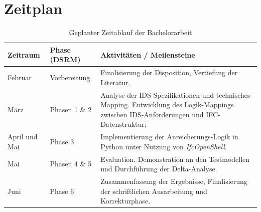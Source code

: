 \section*{Zeitplan}
\label{sec:schedule}

\begin{table}[h!]
\centering
\label{tab:zeitplan}
\begin{tabular}{|l|l|p{7cm}|}
\hline
\textbf{Zeitraum} & \textbf{Phase (DSRM)} & \textbf{Aktivitäten / Meilensteine} \\ \hline
Februar & Vorbereitung & Finalisierung der Disposition, Vertiefung der Literatur. \\ \hline
März & Phasen 1 \& 2 & Analyse der IDS-Spezifikationen und technisches Mapping. Entwicklung des Logik-Mappings zwischen IDS-Anforderungen und IFC-Datenstruktur; \\ \hline
April und Mai & Phase 3 & Implementierung der Anreicherungs-Logik in Python unter Nutzung von \textit{IfcOpenShell}. \\ \hline
Mai & Phasen 4 \& 5 & Evaluation. Demonstration an den Testmodellen und Durchführung der Delta-Analyse. \\ \hline
Juni & Phase 6 & Zusammenfassung der Ergebnisse, Finalisierung der schriftlichen Ausarbeitung und Korrekturphase. \\ \hline
\end{tabular}
\caption{Geplanter Zeitablauf der Bachelorarbeit}
\end{table}